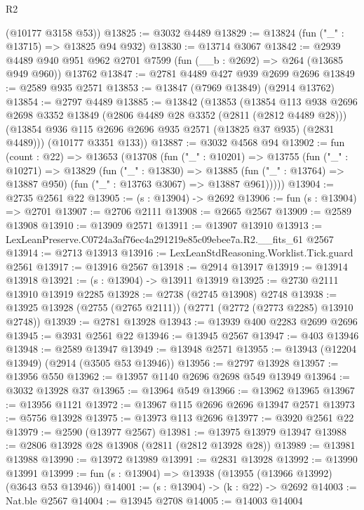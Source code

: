 \begin{lexlean}{R2}
\begin{coremodule}
      (@10177 @3158 @53))
@13825 := @3032 @4489
@13829 := @13824 (fun ("_" : @13715) => @13825 @94 @932)
@13830 := @13714 @3067
@13842 := @2939
    @4489
    @940
    @951
    @962
    @2701
    @7599
    (fun (__b : @2692) => @264 (@13685 @949 @960))
    @13762
@13847 := @2781 @4489 @427 @939 @2699 @2696
@13849 := @2589 @935 @2571
@13853 := @13847 (@7969 @13849) (@2914 @13762)
@13854 := @2797 @4489
@13885 := @13842
    (@13853
      (@13854
        @113
        @938
        @2696
        @2698
        @3352
        @13849
        (@2806 @4489 @28 @3352 (@2811 (@2812 @4489 @28)))
        (@13854 @936 @115 @2696 @2696 @935 @2571 (@13825 @37 @935) (@2831 @4489)))
      (@10177 @3351 @133))
@13887 := @3032 @4568 @94
@13902 := fun (count : @22) =>
  @13653
    (@13708
      (fun ("_" : @10201) =>
      @13755
        (fun ("_" : @10271) =>
        @13829
          (fun ("_" : @13830) =>
          @13885 (fun ("_" : @13764) => @13887 @950) (fun ("_" : @13763 @3067) => @13887 @961)))))
@13904 := @2735 @2561 @22
@13905 := (s : @13904) -> @2692
@13906 := fun (s : @13904) => @2701
@13907 := @2706 @2111
@13908 := @2665 @2567
@13909 := @2589 @13908
@13910 := @13909 @2571
@13911 := @13907 @13910
@13913 := LexLeanPreserve.C0724a3af76ec4a291219e85c09ebee7a.R2.__fits_61 @2567
@13914 := @2713 @13913
@13916 := LexLeanStdReasoning.Worklist.Tick.guard @2561
@13917 := @13916 @2567
@13918 := @2914 @13917
@13919 := @13914 @13918
@13921 := (s : @13904) -> @13911 @13919
@13925 := @2730 @2111 @13910 @13919 @2285
@13928 := @2738 (@2745 @13908) @2748
@13938 := @13925 @13928 (@2755 (@2765 @2111)) (@2771 (@2772 (@2773 @2285) @13910 @2748))
@13939 := @2781 @13928
@13943 := @13939 @400 @2283 @2699 @2696
@13945 := @3931 @2561 @22
@13946 := @13945 @2567
@13947 := @403 @13946
@13948 := @2589 @13947
@13949 := @13948 @2571
@13955 := @13943 (@12204 @13949) (@2914 (@3505 @53 @13946))
@13956 := @2797 @13928
@13957 := @13956 @550
@13962 := @13957 @1140 @2696 @2698 @549 @13949
@13964 := @3032 @13928 @37
@13965 := @13964 @549
@13966 := @13962 @13965
@13967 := @13956 @1121
@13972 := @13967 @115 @2696 @2696 @13947 @2571
@13973 := @5756 @13928
@13975 := @13973 @113 @2696
@13977 := @3920 @2561 @22
@13979 := @2590 (@13977 @2567)
@13981 := @13975 @13979 @13947
@13988 := @2806 @13928 @28 @13908 (@2811 (@2812 @13928 @28))
@13989 := @13981 @13988
@13990 := @13972 @13989
@13991 := @2831 @13928
@13992 := @13990 @13991
@13999 := fun (s : @13904) => @13938 (@13955 (@13966 @13992) (@3643 @53 @13946))
@14001 := (s : @13904) -> (k : @22) -> @2692
@14003 := Nat.ble @2567
@14004 := @13945 @2708
@14005 := @14003 @14004

\end{coremodule}
\end{lexlean}
